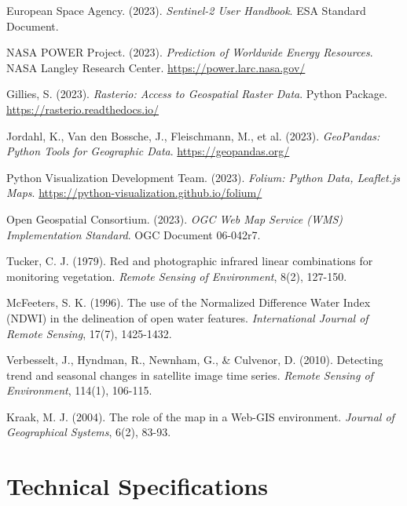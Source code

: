 \documentclass[a4paper,12pt]{article}
\begin{document}
\begin{thebibliography}{99}

    European Space Agency. (2023). \textit{Sentinel-2 User Handbook}. ESA Standard Document.

    NASA POWER Project. (2023). \textit{Prediction of Worldwide Energy Resources}. NASA Langley Research Center. \url{https://power.larc.nasa.gov/}

    Gillies, S. (2023). \textit{Rasterio: Access to Geospatial Raster Data}. Python Package. \url{https://rasterio.readthedocs.io/}

    Jordahl, K., Van den Bossche, J., Fleischmann, M., et al. (2023). \textit{GeoPandas: Python Tools for Geographic Data}. \url{https://geopandas.org/}

    Python Visualization Development Team. (2023). \textit{Folium: Python Data, Leaflet.js Maps}. \url{https://python-visualization.github.io/folium/}

    Open Geospatial Consortium. (2023). \textit{OGC Web Map Service (WMS) Implementation Standard}. OGC Document 06-042r7.

    Tucker, C. J. (1979). Red and photographic infrared linear combinations for monitoring vegetation. \textit{Remote Sensing of Environment}, 8(2), 127-150.

    McFeeters, S. K. (1996). The use of the Normalized Difference Water Index (NDWI) in the delineation of open water features. \textit{International Journal of Remote Sensing}, 17(7), 1425-1432.

    Verbesselt, J., Hyndman, R., Newnham, G., \& Culvenor, D. (2010). Detecting trend and seasonal changes in satellite image time series. \textit{Remote Sensing of Environment}, 114(1), 106-115.

    Kraak, M. J. (2004). The role of the map in a Web-GIS environment. \textit{Journal of Geographical Systems}, 6(2), 83-93.

\end{thebibliography}

\newpage
\appendix

\section{Technical Specifications}
\end{document}
